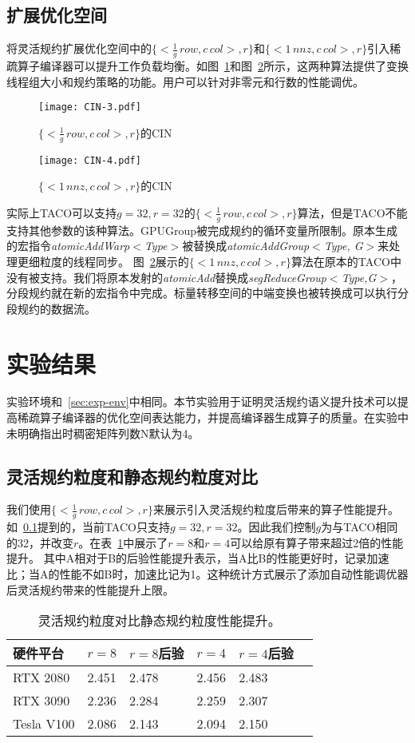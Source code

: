 \subsection{扩展优化空间}\label{sec:comp-space}
将灵活规约扩展优化空间中的$\{<\frac{1}{g}\,row, c\,col>,r\}$和$\{<1\,nnz , c\,col>,r\}$引入稀疏算子编译器可以提升工作负载均衡。如图~\ref{fig:CIN-3}和图~\ref{fig:CIN-4}所示，这两种算法提供了变换线程组大小和规约策略的功能。用户可以针对非零元和行数的性能调优。
\begin{figure}[h]%
  \centering
  \texttt{[image: CIN-3.pdf]}
  \caption{$\{<\frac{1}{g}\,row, c\,col>,r\}$的CIN}\label{fig:CIN-3}
\end{figure}
\begin{figure}[h]%
  \centering
  \texttt{[image: CIN-4.pdf]}
  \caption{$\{<1\,nnz , c\,col>,r\}$的CIN}\label{fig:CIN-4}
\end{figure}
实际上TACO可以支持$g=32, r=32$的$\{<\frac{1}{g}\,row, c\,col>,r\}$算法，但是TACO不能支持其他参数的该种算法。GPUGroup被完成规约的循环变量所限制。原本生成的宏指令\textit{atomicAddWarp$<$Type$>$}被替换成\textit{atomicAddGroup$<$Type, G$>$}来处理更细粒度的线程同步。
图~\ref{fig:CIN-4}展示的$\{<1\,nnz , c\,col>,r\}$算法在原本的TACO中没有被支持。我们将原本发射的\textit{atomicAdd}替换成\textit{segReduceGroup$<$Type,G$>$}，分段规约就在新的宏指令中完成。标量转移空间的中端变换也被转换成可以执行分段规约的数据流。

\section{实验结果}
实验环境和~\ref{sec:exp-env}中相同。本节实验用于证明灵活规约语义提升技术可以提高稀疏算子编译器的优化空间表达能力，并提高编译器生成算子的质量。在实验中未明确指出时稠密矩阵列数N默认为4。
\subsection{灵活规约粒度和静态规约粒度对比}
我们使用$\{<\frac{1}{g}\,row, c\,col>,r\}$来展示引入灵活规约粒度后带来的算子性能提升。如~\ref{sec:comp-space}提到的，当前TACO只支持$g=32, r=32$。因此我们控制$g$为与TACO相同的32，并改变$r$。在表~\ref{tab:comp-flexgra}中展示了$r=8$和$r=4$可以给原有算子带来超过2倍的性能提升。
其中A相对于B的后验性能提升表示，当A比B的性能更好时，记录加速比；当A的性能不如B时，加速比记为1。这种统计方式展示了添加自动性能调优器后灵活规约带来的性能提升上限。
\begin{table}
  \centering
  \caption{灵活规约粒度对比静态规约粒度性能提升。}
  \begin{tabular}{llllll}
  \toprule
  硬件平台 &  $r=8$  & $r=8$后验 & $r=4$  & $r=4$后验\\
  \midrule
  RTX 2080    & 2.451   & 2.478 & 2.456 & 2.483 \\
  RTX 3090    & 2.236   & 2.284  & 2.259 & 2.307 \\
  Tesla V100    & 2.086  & 2.143  & 2.094 & 2.150 \\
  \bottomrule
  \end{tabular}
  \label{tab:comp-flexgra}
\end{table}
